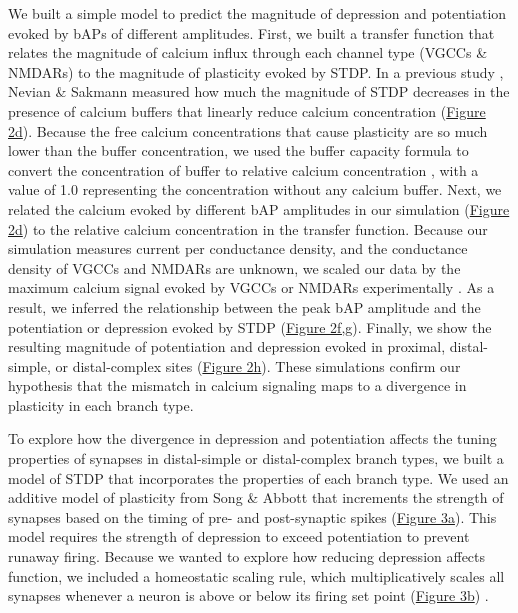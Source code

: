 \documentclass[twocolumn]{theme/bioRxiv}
\begin{document}
We built a simple model to predict the magnitude of depression and potentiation evoked by bAPs of different amplitudes. First, we built a transfer function that relates the magnitude of calcium influx through each channel type (VGCCs \& NMDARs) to the magnitude of plasticity evoked by STDP. In a previous study \citep{nevianSpineCa2Signaling2006}, Nevian \& Sakmann measured how much the magnitude of STDP decreases in the presence of calcium buffers that linearly reduce calcium concentration (\hyperref[fig:2]{Figure 2d}). Because the free calcium concentrations that cause plasticity are so much lower than the buffer concentration, we used the buffer capacity formula to convert the concentration of buffer to relative calcium concentration \citep{sabatiniLifeCycleCa22002}, with a value of 1.0 representing the concentration without any calcium buffer. Next, we related the calcium evoked by different bAP amplitudes in our simulation (\hyperref[fig:2]{Figure 2d}) to the relative calcium concentration in the transfer function. Because our simulation measures current per conductance density, and the conductance density of VGCCs and NMDARs are unknown, we scaled our data by the maximum calcium signal evoked by VGCCs or NMDARs experimentally \citep{landauDendriticBranchStructure2022}. As a result, we inferred the relationship between the peak bAP amplitude and the potentiation or depression evoked by STDP (\hyperref[fig:2]{Figure 2f,g}). Finally, we show the resulting magnitude of potentiation and depression evoked in proximal, distal-simple, or distal-complex sites (\hyperref[fig:2]{Figure 2h}). These simulations confirm our hypothesis that the mismatch in calcium signaling maps to a divergence in plasticity in each branch type.

To explore how the divergence in depression and potentiation affects the tuning properties of synapses in distal-simple or distal-complex branch types, we built a model of STDP that incorporates the properties of each branch type. We used an additive model of plasticity from Song \& Abbott \citep{songCompetitiveHebbianLearning2000} that increments the strength of synapses based on the timing of pre- and post-synaptic spikes (\hyperref[fig:3]{Figure 3a}). This model requires the strength of depression to exceed potentiation to prevent runaway firing. Because we wanted to explore how reducing depression affects function, we included a homeostatic scaling rule, which multiplicatively scales all synapses whenever a neuron is above or below its firing set point (\hyperref[fig:3]{Figure 3b}) \citep{turrigianoHomeostaticPlasticityDeveloping2004}. 
\end{document}

